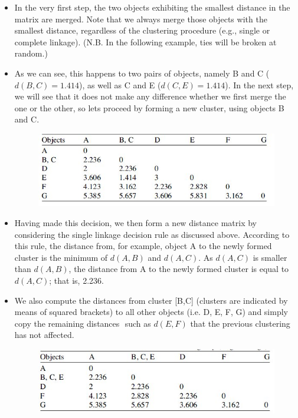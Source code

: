 \documentclass[a4paper,12pt]{article}
\begin{document}
\begin{itemize}
	\item In the very first step, the two
	objects exhibiting the smallest distance in the matrix are merged. Note that we
	always merge those objects with the smallest distance, regardless of the clustering
	procedure (e.g., single or complete linkage). (N.B. In the following example, ties will be broken at random.)
	\item As we can see, this happens to two
	pairs of objects, namely B and C ($d(B, C) = 1.414$), as well as C and E ($d(C, E) =
	1.414$). In the next step, we will see that it does not make any difference whether we
	first merge the one or the other, so lets proceed by forming a new cluster, using
	objects B and C.
	\begin{figure}[h!]
		\begin{center}
			\includegraphics[scale=0.6]{images/DistanceMatrix2.jpg}\\
		\end{center}
	\end{figure}
	\item Having made this decision, we then form a new distance matrix by considering
	the single linkage decision rule as discussed above. According to this rule, the
	distance from, for example, object A to the newly formed cluster is the minimum of
	$d(A, B)$ and $d(A, C)$. As $d(A, C)$ is smaller than $d(A, B)$, the distance from A to the
	newly formed cluster is equal to $d(A, C)$; that is, 2.236.
	\item We also compute the
	distances from cluster [B,C] (clusters are indicated by means of squared brackets)
	to all other objects (i.e. D, E, F, G) and simply copy the remaining distances  such
	as $d(E, F)$  that the previous clustering has not affected.
	\begin{figure}[h!]
		\begin{center}
			\includegraphics[scale=0.6]{images/DistanceMatrix3.jpg}\\

\end{center}
\end{figure}
\end{itemize}
\end{document}
